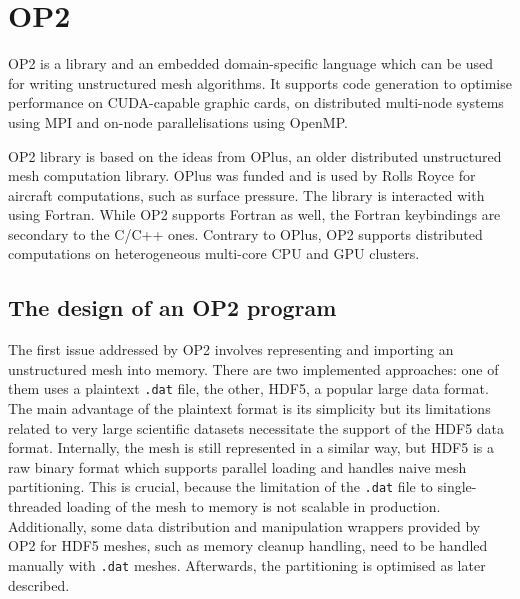 \section{OP2}
OP2 is a library and an embedded domain-specific language which can be used for writing unstructured mesh algorithms\cite{op2_library}. It supports code generation to optimise performance on CUDA-capable graphic cards, on distributed multi-node systems using MPI and on-node parallelisations using OpenMP.

OP2 library is based on the ideas from OPlus, an older distributed unstructured mesh computation library. OPlus was funded and is used by Rolls Royce for aircraft computations, such as surface pressure. The library is interacted with using Fortran\cite{oplus_library}. While OP2 supports Fortran as well, the Fortran keybindings are secondary to the C/C++ ones. Contrary to OPlus, OP2 supports distributed computations on heterogeneous multi-core CPU and GPU clusters. 

\subsection{The design of an OP2 program}

The first issue addressed by OP2 involves representing and importing an unstructured mesh into memory. There are two implemented approaches: one of them uses a plaintext \texttt{.dat} file, the other, HDF5, a popular large data format. The main advantage of the plaintext format is its simplicity but its limitations related to very large scientific datasets necessitate the support of the HDF5 data format. Internally, the mesh is still represented in a similar way, but HDF5 is a raw binary format which supports parallel loading and handles naive mesh partitioning. This is crucial, because the limitation of the \texttt{.dat} file to single-threaded loading of the mesh to memory is not scalable in production. Additionally, some data distribution and manipulation wrappers provided by OP2 for HDF5 meshes, such as memory cleanup handling, need to be handled manually with \texttt{.dat} meshes. Afterwards, the partitioning is optimised as later described.

